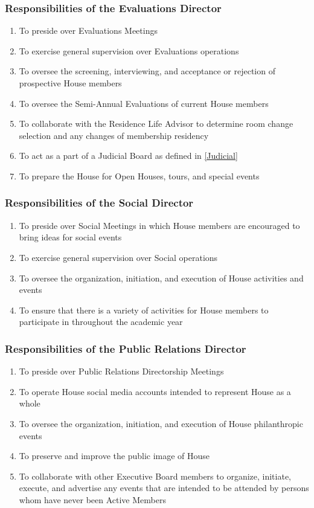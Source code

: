 \documentclass{article}
\newcommand{\asubsection}[1]{\subsubsection{#1} \label{#1}}
\begin{document}
\asubsection{Responsibilities of the Evaluations Director}
\begin{enumerate}
	\item To preside over Evaluations Meetings
	\item To exercise general supervision over Evaluations operations
	\item To oversee the screening, interviewing, and acceptance or rejection of prospective House members
	\item To oversee the Semi-Annual Evaluations of current House members
	\item To collaborate with the Residence Life Advisor to determine room change selection and any changes of membership residency
	\item To act as a part of a Judicial Board as defined in \ref{Judicial}
	\item To prepare the House for Open Houses, tours, and special events
\end{enumerate}

\asubsection{Responsibilities of the Social Director}
\begin{enumerate}
	\item To preside over Social Meetings in which House members are encouraged to bring ideas for social events
	\item To exercise general supervision over Social operations
	\item To oversee the organization, initiation, and execution of House activities and events
	\item To ensure that there is a variety of activities for House members to participate in throughout the academic year
\end{enumerate}

\asubsection{Responsibilities of the Public Relations Director}
\begin{enumerate}
	\item To preside over Public Relations Directorship Meetings
	\item To operate House social media accounts intended to represent House as a whole
	\item To oversee the organization, initiation, and execution of House philanthropic events
	\item To preserve and improve the public image of House
	\item To collaborate with other Executive Board members to organize, initiate, execute, and advertise any events that are intended to be attended by persons whom have never been Active Members

\end{enumerate}
\end{document}
